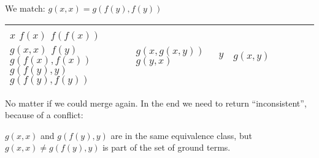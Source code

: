 \documentclass{base}
\begin{document}
We match: $g(x,x) = g(f(y), f(y)) $

\begin{tabular}[]{|l|l|l|l|l|l|l|l|}
\hline
\c{$x$\\$f(x)$ \\ $f(f(x)) $\\$ g(x,x)$ \\ $ f(y) $\\$ g(f(x), f(x)) $ \\ $g(f(y), y) $\\$ g(f(y),f(y))$} &
\c{$ g(x,g(x,y)) $\\$ g(y,x) $} &
\c{$y$} & 
\c{$g(x,y)$} 
\\ \hline
\end{tabular}

No matter if we could merge again. In the end we need to return ``inconsistent'', because of a conflict:

$g(x,x)$ and $g(f(y), y)$ are in the same equivalence class, but $g(x,x) \neq g(f(y), y)$ is part of the set of ground terms.
\end{document}
